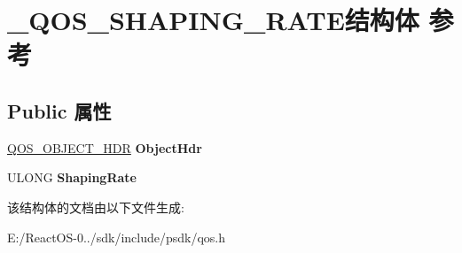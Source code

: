 \hypertarget{struct___q_o_s___s_h_a_p_i_n_g___r_a_t_e}{}\section{\+\_\+\+Q\+O\+S\+\_\+\+S\+H\+A\+P\+I\+N\+G\+\_\+\+R\+A\+T\+E结构体 参考}
\label{struct___q_o_s___s_h_a_p_i_n_g___r_a_t_e}
\subsection*{Public 属性}
\begin{DoxyCompactItemize}
\item 
\mbox{\label{struct___q_o_s___s_h_a_p_i_n_g___r_a_t_e_adea5a062e8d99929bb20ae304e8730e2}} 
\hyperlink{struct___q_o_s___o_b_j_e_c_t___h_d_r}{Q\+O\+S\+\_\+\+O\+B\+J\+E\+C\+T\+\_\+\+H\+DR} {\bfseries Object\+Hdr}
\item 
\mbox{\label{struct___q_o_s___s_h_a_p_i_n_g___r_a_t_e_a219168fa3ccd86ad630730e134bb2dcc}} 
U\+L\+O\+NG {\bfseries Shaping\+Rate}
\end{DoxyCompactItemize}


该结构体的文档由以下文件生成\+:\begin{DoxyCompactItemize}
\item 
E\+:/\+React\+O\+S-\/0../sdk/include/psdk/qos.\+h\end{DoxyCompactItemize}
